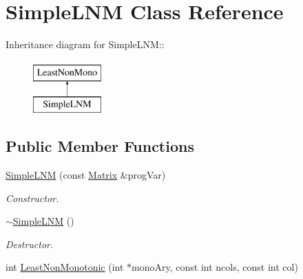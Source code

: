 \hypertarget{classSimpleLNM}{
\section{SimpleLNM Class Reference}
\label{d8/dfe/classSimpleLNM}
}
Inheritance diagram for SimpleLNM::\begin{figure}[H]
\begin{center}
\leavevmode
\includegraphics[height=2cm]{d8/dfe/classSimpleLNM}
\end{center}
\end{figure}
\subsection*{Public Member Functions}
\begin{DoxyCompactItemize}
\item 
\hypertarget{classSimpleLNM_a45bd676f6bb504baf1b46ddcbf2f8fb8}{
\hyperlink{classSimpleLNM_a45bd676f6bb504baf1b46ddcbf2f8fb8}{SimpleLNM} (const \hyperlink{classMatrix}{Matrix} \&progVar)}
\label{d8/dfe/classSimpleLNM_a45bd676f6bb504baf1b46ddcbf2f8fb8}

\begin{DoxyCompactList}\small\item\em Constructor. \item\end{DoxyCompactList}\item 
\hypertarget{classSimpleLNM_a89cbe5270c4846ebba8ab1660149112f}{
\hyperlink{classSimpleLNM_a89cbe5270c4846ebba8ab1660149112f}{$\sim$SimpleLNM} ()}
\label{d8/dfe/classSimpleLNM_a89cbe5270c4846ebba8ab1660149112f}

\begin{DoxyCompactList}\small\item\em Destructor. \item\end{DoxyCompactList}\item 
int \hyperlink{classSimpleLNM_a9d296839ca84467c0f6241b1393bd6d5}{LeastNonMonotonic} (int $\ast$monoAry, const int ncols, const int col)
\end{DoxyCompactItemize}


